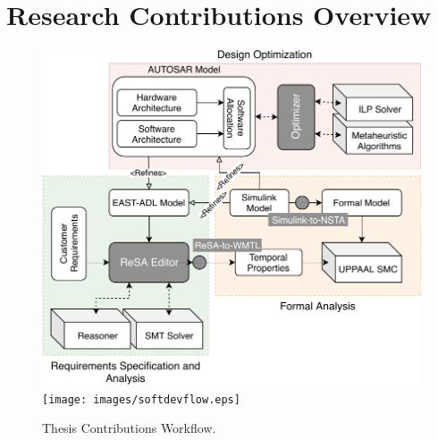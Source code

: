 \section{Research Contributions Overview}
    \begin{figure}[t]
        \centering
        \ifpdf
            \includegraphics[width=\linewidth]{images/softdevflow}
        \else
        		\texttt{[image: images/softdevflow.eps]}
		\fi
	\caption{Thesis Contributions Workflow.} 
    \end{figure}
